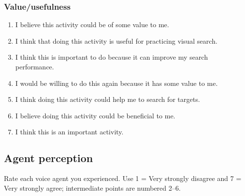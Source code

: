 \subsubsection*{Value/usefulness}\label{imi4}
\begin{enumerate}
\item \begin{minipage}[t]{\linewidth}
I believe this activity could be of some value to me.
\end{minipage}
\item \begin{minipage}[t]{\linewidth}
I think that doing this activity is useful for practicing visual search.
\end{minipage}
\item \begin{minipage}[t]{\linewidth}
I think this is important to do because it can improve my search performance.
\end{minipage}
\item \begin{minipage}[t]{\linewidth}
I would be willing to do this again because it has some value to me.
\end{minipage}
\item \begin{minipage}[t]{\linewidth}
I think doing this activity could help me to search for targets.
\end{minipage}
\item \begin{minipage}[t]{\linewidth}
I believe doing this activity could be beneficial to me.
\end{minipage}
\item \begin{minipage}[t]{\linewidth}
I think this is an important activity.
\end{minipage}
\end{enumerate}
\subsection{Agent perception}
Rate each voice agent you experienced. Use 1 = Very strongly disagree and 7 = Very strongly agree; intermediate points are numbered 2--6.
